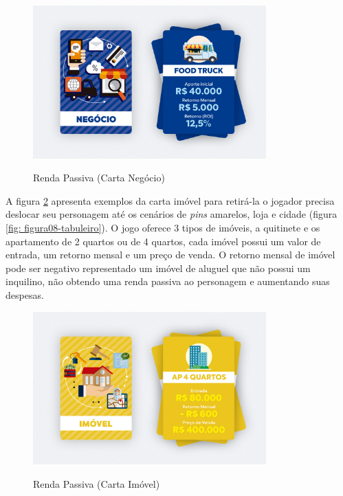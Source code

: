 \graphicspath{{figuras/}}
\begin{figure}[!ht]
\centering
\begin{minipage}{0.8\textwidth}
\caption{Renda Passiva (Carta Negócio)}
\centering
\includegraphics[width=0.8\textwidth]{figuras/fig11-carta-negocio.jpg}
\label{fig: fig11-carta-negocio}
\end{minipage}
\end{figure}

A figura \ref{fig: fig12-carta-imovel} apresenta exemplos da carta imóvel para retirá-la o jogador precisa deslocar seu personagem até os cenários de \textit{pins} amarelos, loja e cidade (figura \ref{fig: figura08-tabuleiro}). O jogo oferece 3 tipos de imóveis, a quitinete e os apartamento de 2 quartos ou de 4 quartos, cada imóvel possui um valor de entrada, um retorno mensal e um preço de venda. O retorno mensal de imóvel pode ser negativo representado um imóvel de aluguel que não possui um inquilino, não obtendo uma renda passiva ao personagem e aumentando suas despesas.

\graphicspath{{figuras/}}
\begin{figure}[!ht]
\centering
\begin{minipage}{0.8\textwidth}
\caption{Renda Passiva (Carta Imóvel)}
\centering
\includegraphics[width=0.8\textwidth]{figuras/fig12-carta-imovel.jpg}
\label{fig: fig12-carta-imovel}
\end{minipage}
\end{figure}


